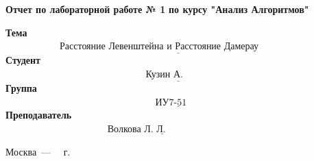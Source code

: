 \begin{titlepage}
	
	\begin{center}\centering
		\Large\textbf{Отчет по лабораторной работе № 1}\newline
		\Large\textbf {по курсу "Анализ Алгоритмов"}\newline
	\end{center}
	
	\noindent\textbf{Тема} $\underline{\text{~~~~~~~~~~~~~~~~~Расстояние Левенштейна и Расстояние Дамерау Левенштейна~~~~~~~~~~~}}$\newline\newline\newline\newline\newline
	\noindent\textbf{Студент} $\underline{\text{~~~~~~~~~~~~~~~~~~~~~~~~~~~~~~~~~~~~~~~~~~~~Кузин А. А.~~~~~~~~~~~~~~~~~~~~~~~~~~~~~~~~~~~~~~~~~~~~~~~~~}}$\newline\newline
	\noindent\textbf{Группа} $\underline{\text{~~~~~~~~~~~~~~~~~~~~~~~~~~~~~~~~~~~~~~~~~~~~~~~ИУ7-51 Б~~~~~~~~~~~~~~~~~~~~~~~~~~~~~~~~~~~~~~~~~~~~~~~~~~}}$\newline\newline
	\noindent\textbf{Преподаватель} $\underline{\text{~~~~~~~~~~~~~~~~~~~~~~~~~~~~~~~~Волкова Л. Л.~~~~~~~~~~~~~~~~~~~~~~~~~~~~~~~~~~~~~~~~~~~~~~~~}}$\newline
	

	\begin{center}
		\vfill
		Москва~---~\the\year
		~г.
	\end{center}
	\restoregeometry
\end{titlepage}
